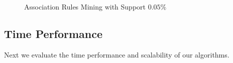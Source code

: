 \begin{figure}[tb]
\centering
{}
 \caption{Association Rules Mining with Support $0.05 \%$}
 \label{fig:rulemining}
\end{figure}

\subsection{Time Performance}\label{sec:eval:performance}
Next we evaluate the time performance and scalability of
our algorithms.

